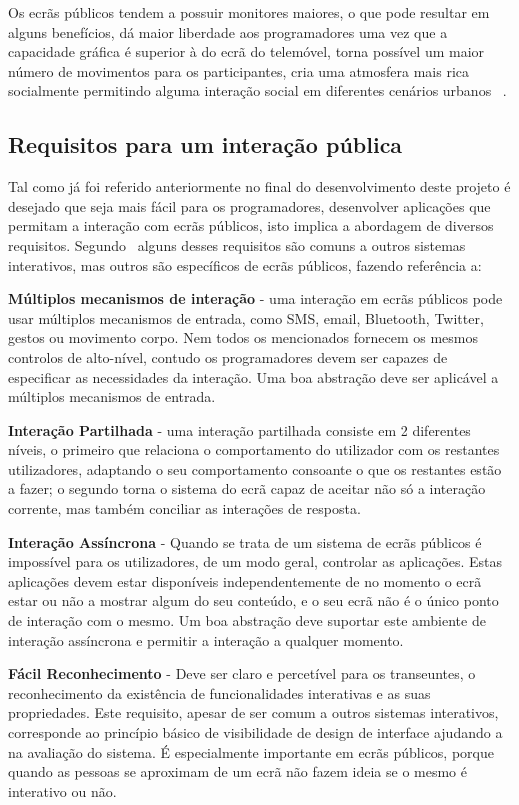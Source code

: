 Os ecrãs públicos tendem a possuir monitores maiores, o que pode resultar em alguns benefícios, dá maior liberdade aos programadores uma vez que a capacidade gráfica é superior à do ecrã do telemóvel, torna possível um maior número de movimentos para os participantes, cria uma atmosfera mais rica socialmente permitindo alguma interação social em diferentes cenários urbanos ~\cite{Vajk2008b}.

\subsection{Requisitos para um interação pública} \label{batik} 

Tal como já foi referido anteriormente no final do desenvolvimento deste projeto é desejado que seja mais fácil para os programadores, desenvolver aplicações que permitam a interação com ecrãs públicos, isto implica a abordagem de diversos requisitos. Segundo~\cite{Cardoso2012g} alguns desses requisitos são comuns a outros sistemas interativos, mas outros são específicos de ecrãs públicos, fazendo referência a:

\textbf{Múltiplos mecanismos de interação} - uma interação em ecrãs públicos pode usar múltiplos mecanismos de entrada, como SMS, email, Bluetooth, Twitter, gestos ou movimento corpo. Nem todos os mencionados fornecem os mesmos controlos de alto-nível, contudo os programadores devem ser capazes de especificar as necessidades da interação. Uma boa abstração deve ser aplicável a múltiplos mecanismos de entrada.

\textbf{Interação Partilhada} - uma interação partilhada consiste em 2 diferentes níveis, o primeiro que relaciona o comportamento do utilizador com os restantes utilizadores, adaptando o seu comportamento consoante o que os restantes estão a fazer; o segundo torna o sistema do ecrã capaz de aceitar não só a interação corrente, mas também conciliar as interações de resposta.

\textbf{Interação Assíncrona} - Quando se trata de um sistema de ecrãs públicos é impossível para os utilizadores, de um modo geral, controlar as aplicações. Estas aplicações devem estar disponíveis independentemente de no momento o ecrã estar ou não a mostrar algum do seu conteúdo, e o seu ecrã não é o único ponto de interação com o mesmo. Um boa abstração deve suportar este ambiente de interação assíncrona e permitir a interação a qualquer momento.

\textbf{Fácil Reconhecimento} - Deve ser claro e percetível para os transeuntes, o reconhecimento da existência de funcionalidades interativas e as suas propriedades. Este requisito, apesar de ser comum a outros sistemas interativos, corresponde ao princípio básico de visibilidade de design de interface ajudando a na avaliação do sistema. É especialmente importante em ecrãs públicos, porque quando as pessoas se aproximam de um ecrã não fazem ideia se o mesmo é interativo ou não.

